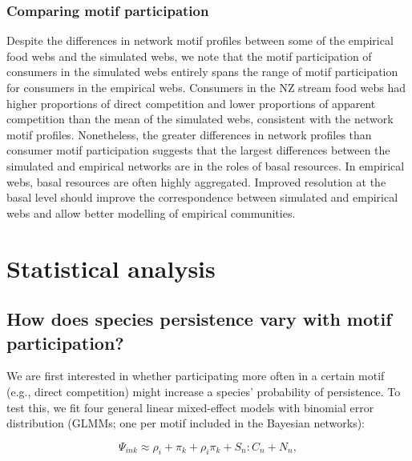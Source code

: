 \documentclass[12pt]{article}
\begin{document}
\begin{spacing}{2.0}
    
    \subsubsection*{Comparing motif participation}
      
      Despite the differences in network motif profiles between some of the empirical food webs and the simulated webs, we note that the motif participation of consumers in the simulated webs entirely spans the range of motif participation for consumers in the empirical webs.
      Consumers in the NZ stream food webs had higher proportions of direct competition and lower proportions of apparent competition than the mean of the simulated webs, consistent with the network motif profiles.
      Nonetheless, the greater differences in network profiles than consumer motif participation suggests that the largest differences between the simulated and empirical networks are in the roles of basal resources.
      In empirical webs, basal resources are often highly aggregated. 
      Improved resolution at the basal level should improve the correspondence between simulated and empirical webs and allow better modelling of empirical communities.
    

\clearpage        

        
\section{Statistical analysis}

    \subsection{How does species persistence vary with motif participation?}

        We are first interested in whether participating more often in a certain motif (e.g., direct competition) might increase a species' probability of persistence.
        To test this, we fit four general linear mixed-effect models with binomial error distribution (GLMMs; one per motif included in the Bayesian networks):

        \begin{equation}
            \Psi_{ink} \approx \rho_{i} + \pi_{k} + \rho_{i}\pi_{k} +
            S_{n}:C_{n} + N_n,
            \label{propreq}
        \end{equation}



\end{spacing}
\end{document}
